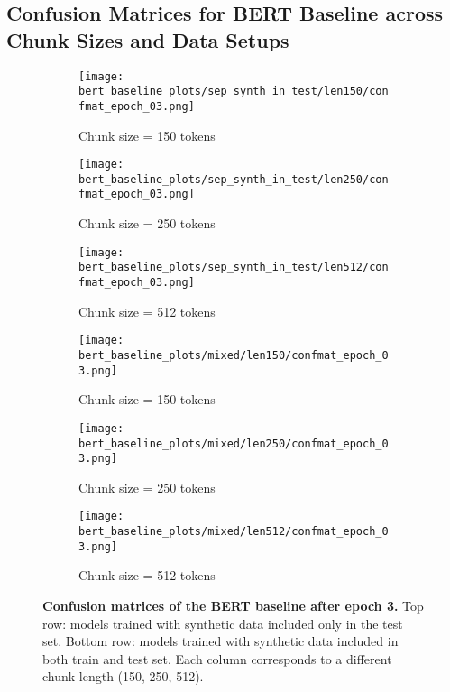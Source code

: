 \subsection{Confusion Matrices for BERT Baseline across Chunk Sizes and Data Setups}

\begin{figure}[H]
  \centering

  \begin{subfigure}[t]{0.32\textwidth}
    \centering
    \texttt{[image: bert\_baseline\_plots/sep\_synth\_in\_test/len150/confmat\_epoch\_03.png]}
    \caption{Chunk size = 150 tokens}
  \end{subfigure}\hfill
  \begin{subfigure}[t]{0.32\textwidth}
    \centering
    \texttt{[image: bert\_baseline\_plots/sep\_synth\_in\_test/len250/confmat\_epoch\_03.png]}
    \caption{Chunk size = 250 tokens}
  \end{subfigure}\hfill
  \begin{subfigure}[t]{0.32\textwidth}
    \centering
    \texttt{[image: bert\_baseline\_plots/sep\_synth\_in\_test/len512/confmat\_epoch\_03.png]}
    \caption{Chunk size = 512 tokens}
  \end{subfigure}

  \vspace{0.4cm}
  \begin{subfigure}[t]{0.32\textwidth}
    \centering
    \texttt{[image: bert\_baseline\_plots/mixed/len150/confmat\_epoch\_03.png]}
    \caption{Chunk size = 150 tokens}
  \end{subfigure}\hfill
  \begin{subfigure}[t]{0.32\textwidth}
    \centering
    \texttt{[image: bert\_baseline\_plots/mixed/len250/confmat\_epoch\_03.png]}
    \caption{Chunk size = 250 tokens}
  \end{subfigure}\hfill
  \begin{subfigure}[t]{0.32\textwidth}
    \centering
    \texttt{[image: bert\_baseline\_plots/mixed/len512/confmat\_epoch\_03.png]}
    \caption{Chunk size = 512 tokens}
  \end{subfigure}

  \caption[Confusion matrices of BERT baseline after epoch 3.]{\textbf{Confusion matrices of the BERT baseline after epoch 3.}  
  Top row: models trained with synthetic data included only in the test set.  
  Bottom row: models trained with synthetic data included in both train and test set.  
  Each column corresponds to a different chunk length (150, 250, 512).}
  \label{fig:bert_confusionmatrices_epoch3}
\end{figure}

